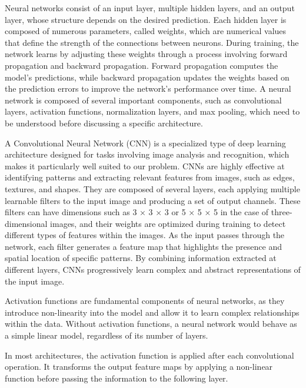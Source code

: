 \documentclass[12pt]{article}
\begin{document}
Neural networks consist of an input layer, multiple hidden layers, and an output layer, whose structure depends on the desired prediction.
Each hidden layer is composed of numerous parameters, called weights, which are numerical values that define the strength of the connections between neurons.
During training, the network learns by adjusting these weights through a process involving forward propagation and backward propagation.
Forward propagation computes the model's predictions, while backward propagation updates the weights based on the prediction errors to improve the network's performance over time.
A neural network is composed of several important components, such as convolutional layers, activation functions, normalization layers, and max pooling, which need to be understood before discussing a specific architecture.
\vspace{0.5cm}

A Convolutional Neural Network (CNN) is a specialized type of deep learning architecture designed for tasks involving image analysis and recognition, which makes it particularly well suited to our problem.
CNNs are highly effective at identifying patterns and extracting relevant features from images, such as edges, textures, and shapes.
They are composed of several layers, each applying multiple learnable filters to the input image and producing a set of output channels.
These filters can have dimensions such as 3 × 3 × 3 or 5 × 5 × 5 in the case of three-dimensional images, and their weights are optimized during training to detect different types of features within the images.
As the input passes through the network, each filter generates a feature map that highlights the presence and spatial location of specific patterns.
By combining information extracted at different layers, CNNs progressively learn complex and abstract representations of the input image.
\vspace{0.5cm}

Activation functions are fundamental components of neural networks, as they introduce non-linearity into the model and allow it to learn complex relationships within the data. 
Without activation functions, a neural network would behave as a simple linear model, regardless of its number of layers.
\vspace{0.5cm}

In most architectures, the activation function is applied after each convolutional operation. 
It transforms the output feature maps by applying a non-linear function before passing the information to the following layer.
\vspace{0.5cm}
\end{document}
